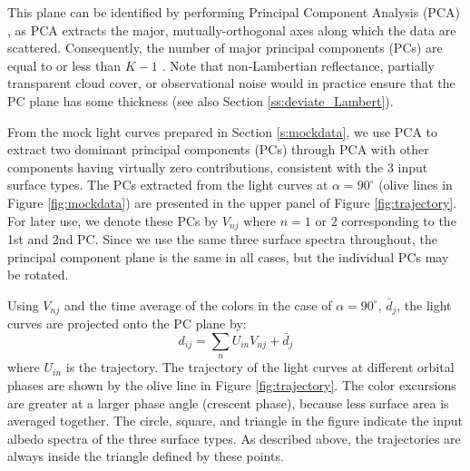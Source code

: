 \documentclass[iop,numberedappendix,apj]{emulateapj}
\def\edit#1{\textcolor{red}{#1}}
\begin{document}
This plane can be identified by performing Principal Component Analysis (PCA) \citep{Cowan2009,Cowan2011}, as PCA extracts the major, mutually-orthogonal axes along which the data are scattered. 
Consequently, the number of major principal components (PCs) are equal to or less than $K-1$ \citep{Cowan2011}. 
Note that non-Lambertian reflectance, partially transparent cloud cover, or observational noise would in practice ensure that the PC plane has some thickness (see also Section \ref{ss:deviate_Lambert}). 

From the mock light curves prepared in Section \ref{s:mockdata}, 
we use PCA to extract two dominant principal components (PCs) through PCA with other components having virtually zero contributions, consistent with the 3 input surface types.  
The PCs extracted from the light curves at $\alpha = 90^{\circ }$ (olive lines in Figure \ref{fig:mockdata}) are presented in the upper panel of Figure \ref{fig:trajectory}. 
For later use, we denote these PCs by $V_{nj}$ where $n=1$ or $2$  corresponding to the 1st and 2nd PC. 
Since we use the same three surface spectra throughout, the principal component plane is the same in all cases, but the individual PCs may be rotated. 

Using $V_{nj}$ and the time average of the colors in the case of $\alpha = 90^{\circ }$, $\bar d_j$, the light curves are projected onto the PC plane by:
\begin{equation}
d_{ij} = \sum_n U_{in} V_{nj} + \bar d_j
\end{equation}
where $U_{in}$ is the trajectory. %
The trajectory of the light curves at different orbital phases are shown by the olive line in Figure \ref{fig:trajectory}. 
The color excursions are greater at a larger phase angle (crescent phase), because less surface area is averaged together.  
The circle, square, and triangle in the figure indicate the input albedo spectra of the three surface types. 
As described above, the trajectories are always inside the triangle defined by these points. 
 
\end{document}
